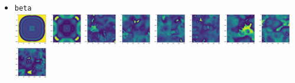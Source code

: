 \begin{itemize}
\item {\tt beta}\\
\includegraphics[height=1.4cm]{python_codes/fieldstone_171/pearson93_rand/beta_solution_0001000_u}
\includegraphics[height=1.4cm]{python_codes/fieldstone_171/pearson93_rand/beta_solution_0005000_u}
\includegraphics[height=1.4cm]{python_codes/fieldstone_171/pearson93_rand/beta_solution_0010000_u}
\includegraphics[height=1.4cm]{python_codes/fieldstone_171/pearson93_rand/beta_solution_0015000_u}
\includegraphics[height=1.4cm]{python_codes/fieldstone_171/pearson93_rand/beta_solution_0020000_u}
\includegraphics[height=1.4cm]{python_codes/fieldstone_171/pearson93_rand/beta_solution_0030000_u}
\includegraphics[height=1.4cm]{python_codes/fieldstone_171/pearson93_rand/beta_solution_0040000_u}
\includegraphics[height=1.4cm]{python_codes/fieldstone_171/pearson93_rand/beta_solution_0050000_u}
\includegraphics[height=1.4cm]{python_codes/fieldstone_171/pearson93_rand/beta_solution_final_u}\\

\end{itemize}
